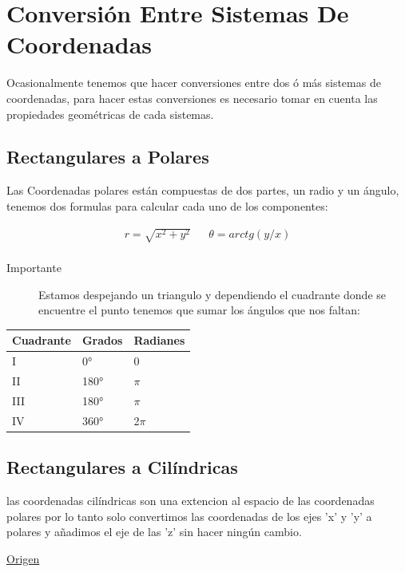 \documentclass{article}
\begin{document}
\section{Conversión Entre Sistemas De Coordenadas}
\label{sec:orge23b207}
Ocasionalmente tenemos que hacer conversiones entre dos ó más sistemas de coordenadas, para hacer estas conversiones es necesario tomar en cuenta las propiedades geométricas de cada sistemas.

\subsection{Rectangulares a Polares}
\label{sec:org0acd6a7}
Las Coordenadas polares están compuestas de dos partes, un radio y un ángulo, tenemos dos formulas para calcular cada uno de los componentes: 

\[\begin{aligned}
 r = \sqrt{x^2+y^2} && \theta = arctg\left(y/x\right) \\
\end{aligned}\] 

\begin{description}
\item[{Importante}] Estamos despejando un triangulo y dependiendo el cuadrante donde se encuentre el punto tenemos que sumar los ángulos que nos faltan:
\end{description}

\begin{center}
\label{tab:org0dd5f7f}
\begin{tabular}{lll}
Cuadrante & Grados & Radianes\\
\hline
I & 0° & 0\\
II & 180° & \(\pi\)\\
III & 180° & \(\pi\)\\
IV & 360° & 2\(\pi\)\\
\end{tabular}
\end{center}

\subsection{Rectangulares a Cilíndricas}
\label{sec:org7670c4f}
las coordenadas cilíndricas son una extencion al espacio de las coordenadas polares por lo tanto solo convertimos las coordenadas de los ejes 'x' y 'y' a polares y añadimos el eje de las 'z' sin hacer ningún cambio.

\href{http://www.learningaboutelectronics.com/Articulos/Calculadora-de-conversion-de-coordenadas-cartesianas-a-cilindricas.php}{Origen}
\end{document}
